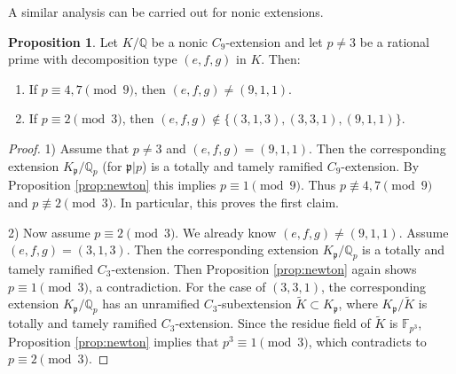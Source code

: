 \documentclass[letterpaper, 10pt]{article}
\newcommand{\bF}{\mathbb{F}}
\newcommand{\bQ}{\mathbb{Q}}
\newcommand{\frp}{\mathfrak{p}}
\newcommand{\1}{\mathds{1}}	%
\theoremstyle{definition}
\newtheorem{proposition}[theorem]{Proposition}
\theoremstyle{remark}
\begin{document}
A similar analysis can be carried out for nonic extensions.

\begin{proposition}
    \label{prop:C9ram}
    Let $K / \bQ$ be a nonic $C_9$-extension and let $p \ne 3$ be a rational prime with decomposition type $(e, f, g)$ in $K$. Then: 
    \begin{enumerate}
        \item If $p \equiv 4, 7 \pmod{9}$, then $(e, f, g) \ne (9, 1, 1)$.
        \item If $p \equiv 2 \pmod{3}$, then $(e, f, g) \not \in \{(3, 1, 3), (3, 3, 1), (9, 1, 1)\}$.
    \end{enumerate}
\end{proposition}
\begin{proof}
1)    Assume that $p \ne 3$ and $(e, f, g) = (9, 1, 1)$.
    Then the corresponding extension $K_\frp / \bQ_p$ (for $\frp|p$) is a totally and tamely ramified $C_9$-extension. By Proposition \ref{prop:newton} this implies $p \equiv 1 \pmod{9}$. Thus $p \not \equiv 4,7 \pmod 9$ and $p \not \equiv 2 \pmod 3$. In particular, this proves the first claim.

  2)  Now assume $p \equiv 2 \pmod{3}$.
    We already know $(e, f, g) \ne (9, 1, 1)$.
    Assume $(e, f, g) = (3, 1, 3)$. Then the corresponding extension $K_\frp / \bQ_p$ is a totally and tamely ramified $C_3$-extension.
    Then Proposition \ref{prop:newton} again shows $p \equiv 1 \pmod{3}$, a contradiction.
    For the case of $(3, 3, 1)$, the corresponding extension $K_\frp / \bQ_p$ has an unramified $C_3$-subextension $\tilde K \subset K_\frp$, where $K_\frp / \tilde K$ is totally and tamely ramified $C_3$-extension.
    Since the residue field of $\tilde K$ is $\bF_{p^3}$, Proposition \ref{prop:newton} implies that $p^3 \equiv 1 \pmod{3}$, which contradicts to $p \equiv 2 \pmod{3}$.
\end{proof}
\end{document}
